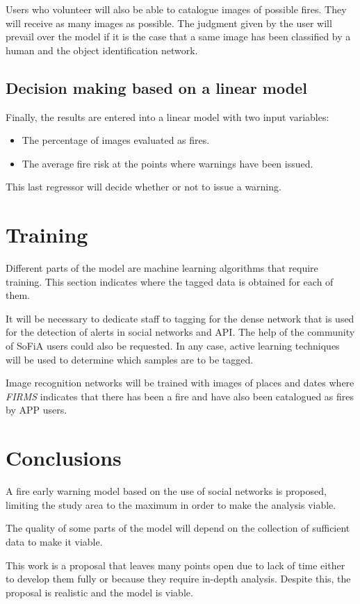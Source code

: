 \documentclass{article}
\begin{document}
Users who volunteer will also be able to catalogue images of possible fires.
They will receive as many images as possible.
The judgment given by the user will prevail over the model if it is the case that a same image has been classified by a human and the object identification network.


\subsection{Decision making based on a linear model}

Finally, the results are entered into a linear model with two input variables:
\begin{itemize}
	\item The percentage of images evaluated as fires.
	\item The average fire risk at the points where warnings have been issued.
\end{itemize}
This last regressor will decide whether or not to issue a warning.

\section{Training}

Different parts of the model are machine learning algorithms that require training.
This section indicates where the tagged data is obtained for each of them.

It will be necessary to dedicate staff to tagging for the dense network that is used for the detection of alerts in social networks and API.
The help of the community of SoFiA users could also be requested.
In any case, active learning techniques will be used to determine which samples are to be tagged.

Image recognition networks will be trained with images of places and dates where \textit{FIRMS} indicates that there has been a fire and have also been catalogued as fires by APP users.

\section{Conclusions}

A fire early warning model based on the use of social networks is proposed, limiting the study area to the maximum in order to make the analysis viable.

The quality of some parts of the model will depend on the collection of sufficient data to make it viable.

This work is a proposal that leaves many points open due to lack of time either to develop them fully or because they require in-depth analysis.
Despite this, the proposal is realistic and the model is viable.




\end{document}
